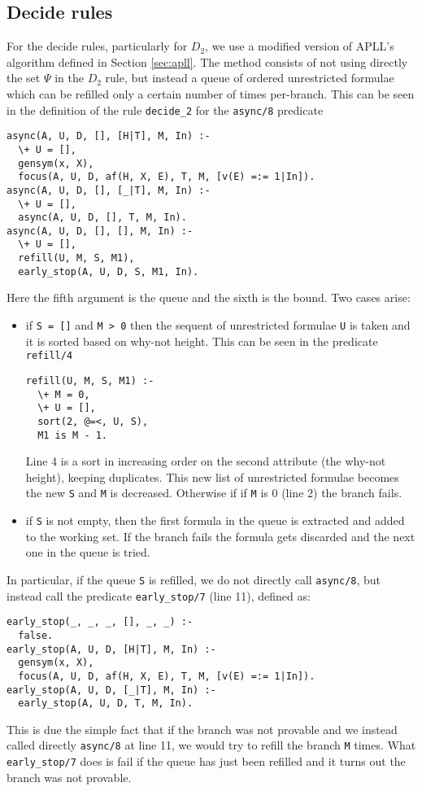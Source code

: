 \subsection{Decide rules}\label{sec:decide}
For the decide rules, particularly for $D_2$, we use a modified version of APLL's algorithm defined in Section \ref{sec:apll}.
The method consists of not using directly the set $\Psi$ in the $D_2$ rule, but instead a queue of ordered unrestricted formulae which can be refilled only a certain number of times per-branch.
This can be seen in the definition of the rule \texttt{decide\_2} for the \texttt{async/8} predicate
\begin{verbatim}
async(A, U, D, [], [H|T], M, In) :-
  \+ U = [],
  gensym(x, X),
  focus(A, U, D, af(H, X, E), T, M, [v(E) =:= 1|In]).
async(A, U, D, [], [_|T], M, In) :-
  \+ U = [],
  async(A, U, D, [], T, M, In).
async(A, U, D, [], [], M, In) :-
  \+ U = [],
  refill(U, M, S, M1),
  early_stop(A, U, D, S, M1, In).
\end{verbatim}
Here the fifth argument is the queue and the sixth is the bound.
Two cases arise:
\begin{itemize}
	\item if \texttt{S = []} and \texttt{M > 0} then the sequent of unrestricted formulae \texttt{U} is taken and it is sorted based on why-not height.	%
		This can be seen in the predicate \texttt{refill/4}
		\begin{verbatim}
refill(U, M, S, M1) :-
  \+ M = 0,
  \+ U = [], 
  sort(2, @=<, U, S), 
  M1 is M - 1.
		\end{verbatim}
		Line 4 is a sort in increasing order on the second attribute (the why-not height), keeping duplicates.
		This new list of unrestricted formulae becomes the new \texttt{S} and \texttt{M} is decreased.
		Otherwise if if \texttt{M} is 0 (line 2) the branch fails.
	\item if \texttt{S} is not empty, then the first formula in the queue is extracted and added to the working set.	%
		If the branch fails the formula gets discarded and the next one in the queue is tried.	%
\end{itemize}
In particular, if the queue \texttt{S} is refilled, we do not directly call \texttt{async/8}, but instead call the predicate \texttt{early\_stop/7} (line 11), defined as:
\begin{verbatim}
early_stop(_, _, _, [], _, _) :-
  false.
early_stop(A, U, D, [H|T], M, In) :-
  gensym(x, X),
  focus(A, U, D, af(H, X, E), T, M, [v(E) =:= 1|In]).
early_stop(A, U, D, [_|T], M, In) :-
  early_stop(A, U, D, T, M, In).
\end{verbatim}
This is due the simple fact that if the branch was not provable and we instead called directly \texttt{async/8} at line 11, we would try to refill the branch \texttt{M} times.
What \texttt{early\_stop/7} does is fail if the queue has just been refilled and it turns out the branch was not provable.

